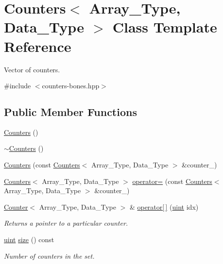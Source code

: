 \hypertarget{class_counters}{}\section{Counters$<$ Array\+\_\+\+Type, Data\+\_\+\+Type $>$ Class Template Reference}
\label{class_counters}


Vector of counters.  




{\ttfamily \#include $<$counters-\/bones.\+hpp$>$}

\subsection*{Public Member Functions}
\begin{DoxyCompactItemize}
\item 
\hyperlink{class_counters_a98e4efd06b3d878609911e392a8f42ce}{Counters} ()
\item 
\hyperlink{class_counters_a6ce3fa5d32d646efb5d83fa1feaf5e95}{$\sim$\+Counters} ()
\item 
\hyperlink{class_counters_a178c0267c1f52a36e10e9d257a21a224}{Counters} (const \hyperlink{class_counters}{Counters}$<$ Array\+\_\+\+Type, Data\+\_\+\+Type $>$ \&counter\+\_\+)
\item 
\hyperlink{class_counters}{Counters}$<$ Array\+\_\+\+Type, Data\+\_\+\+Type $>$ \hyperlink{class_counters_a0edeb22b0b1640f7ada1ef47a30ac486}{operator=} (const \hyperlink{class_counters}{Counters}$<$ Array\+\_\+\+Type, Data\+\_\+\+Type $>$ \&counter\+\_\+)
\item 
\hyperlink{class_counter}{Counter}$<$ Array\+\_\+\+Type, Data\+\_\+\+Type $>$ \& \hyperlink{class_counters_a031002f578171aaa615d08b1a2f9be40}{operator\mbox{[}$\,$\mbox{]}} (\hyperlink{typedefs_8hpp_a91ad9478d81a7aaf2593e8d9c3d06a14}{uint} idx)
\begin{DoxyCompactList}\small\item\em Returns a pointer to a particular counter. \end{DoxyCompactList}\item 
\hyperlink{typedefs_8hpp_a91ad9478d81a7aaf2593e8d9c3d06a14}{uint} \hyperlink{class_counters_af213b17c55496b565ad6ce7a9b0a56e1}{size} () const
\begin{DoxyCompactList}\small\item\em Number of counters in the set. \end{DoxyCompactList}\item 

\end{DoxyCompactItemize}
